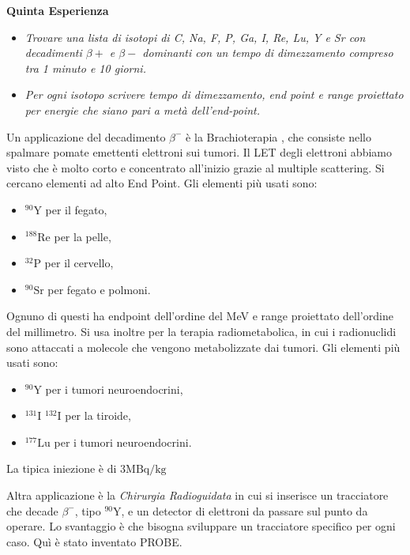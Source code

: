 \textbf{Quinta Esperienza}\\

\begin{itemize}
\item \emph{Trovare una lista di isotopi di C, Na, F, P, Ga, I, Re, Lu, Y e Sr con decadimenti $\beta+$ e $\beta-$ dominanti con un tempo di dimezzamento compreso tra 1 minuto e 10 giorni.}
\item \emph{Per ogni isotopo scrivere tempo di dimezzamento, end point e range proiettato per energie che siano pari a metà dell'end-point.}
\end{itemize}



Un applicazione del decadimento $\beta^-$ è la Brachioterapia \cite{Brachioterapia}, che consiste nello spalmare pomate emettenti elettroni sui tumori. Il LET degli elettroni abbiamo visto che è molto corto e concentrato all'inizio grazie al multiple scattering. Si cercano elementi ad alto End Point. Gli elementi più usati sono:
\begin{itemize}
\item $^{90}\text{Y}$ per il fegato,
\item $^{188}\text{Re}$ per la pelle,
\item $^{32}\text{P}$ per il cervello,
\item $^{90}\text{Sr}$ per fegato e polmoni.
\end{itemize}

Ognuno di questi ha endpoint dell'ordine del MeV e range proiettato dell'ordine del millimetro.
Si usa inoltre per la terapia radiometabolica, in cui i radionuclidi sono attaccati a molecole che vengono metabolizzate dai tumori. Gli elementi più usati sono:

\begin{itemize}
\item $^{90}\text{Y}$ per i tumori neuroendocrini,
\item $^{131}\text{I}$ $^{132}\text{I}$ per la tiroide,
\item $^{177}\text{Lu}$ per i tumori neuroendocrini.
\end{itemize}

La tipica iniezione è di $3 \text{MBq/kg}$

Altra applicazione è la \emph{Chirurgia Radioguidata} in cui si inserisce un tracciatore che decade $\beta^-$, tipo $^{90}\text{Y}$, e un detector di elettroni da passare sul punto da operare. Lo svantaggio è che bisogna sviluppare un tracciatore specifico per ogni caso. Quì è stato inventato PROBE.

